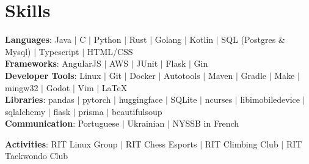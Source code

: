 \documentclass[letterpaper,11pt]{article}
\begin{document}
\section{Skills}
 \begin{itemize}[leftmargin=0.15in, label={}]
    \small{\item{
        \textbf{Languages}{: Java $|$ C $|$ Python $|$ Rust $|$ Golang $|$ Kotlin $|$ SQL (Postgres \& Mysql) $|$ Typescript $|$ HTML/CSS} \\ \vspace{0.5em} 
        \textbf{Frameworks}{: AngularJS $|$ AWS $|$ JUnit $|$ Flask $|$ Gin} \\ \vspace{0.5em} 
        \textbf{Developer Tools}{: Linux $|$ Git $|$ Docker $|$ Autotools $|$ Maven $|$ Gradle $|$ Make $|$ mingw32 $|$ Godot $|$ Vim $|$ \LaTeX} \\ \vspace{0.5em} 
        \textbf{Libraries}{: pandas $|$ pytorch $|$ huggingface $|$ SQLite $|$ ncurses $|$ libimobiledevice $|$ sqlalchemy $|$ flask $|$ prisma $|$ beautifulsoup} \\ \vspace{0.5em} 
        \textbf{Communication}{: Portuguese $|$ Ukrainian $|$ NYSSB in French} \\ \vspace{0.5em} 

        \textbf{Activities}{: RIT Linux Group $|$ RIT Chess Esports $|$ RIT Climbing Club $|$ RIT Taekwondo Club}}}
 \end{itemize}


\end{document}
